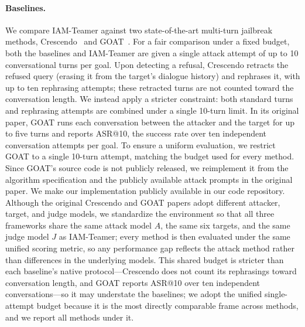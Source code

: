 \documentclass[a4paper,fleqn]{cas-sc}
\begin{document}
\paragraph{Baselines.}
We compare IAM-Teamer against two state-of-the-art multi-turn jailbreak methods, Crescendo~\cite{crescendo} and GOAT~\cite{goat}.
For a fair comparison under a fixed budget, both the baselines and IAM-Teamer are given a single attack attempt of up to 10 conversational turns per goal.
Upon detecting a refusal, Crescendo retracts the refused query (erasing it from the target's dialogue history) and rephrases it, with up to ten rephrasing attempts; these retracted turns are not counted toward the conversation length.
We instead apply a stricter constraint: both standard turns and rephrasing attempts are combined under a single 10-turn limit.
In its original paper, GOAT runs each conversation between the attacker and the target for up to five turns and reports ASR@10, the success rate over ten independent conversation attempts per goal.
To ensure a uniform evaluation, we restrict GOAT to a single 10-turn attempt, matching the budget used for every method.
Since GOAT's source code is not publicly released, we reimplement it from the algorithm specification and the publicly available attack prompts in the original paper.
We make our implementation publicly available in our code repository.
Although the original Crescendo and GOAT papers adopt different attacker, target, and judge models, we standardize the environment so that all three frameworks share the same attack model $A$, the same six targets, and the same judge model $J$ as IAM-Teamer; every method is then evaluated under the same unified scoring metric, so any performance gap reflects the attack method rather than differences in the underlying models.
This shared budget is stricter than each baseline's native protocol---Crescendo does not count its rephrasings toward conversation length, and GOAT reports ASR@10 over ten independent conversations---so it may understate the baselines; we adopt the unified single-attempt budget because it is the most directly comparable frame across methods, and we report all methods under it.
\end{document}
